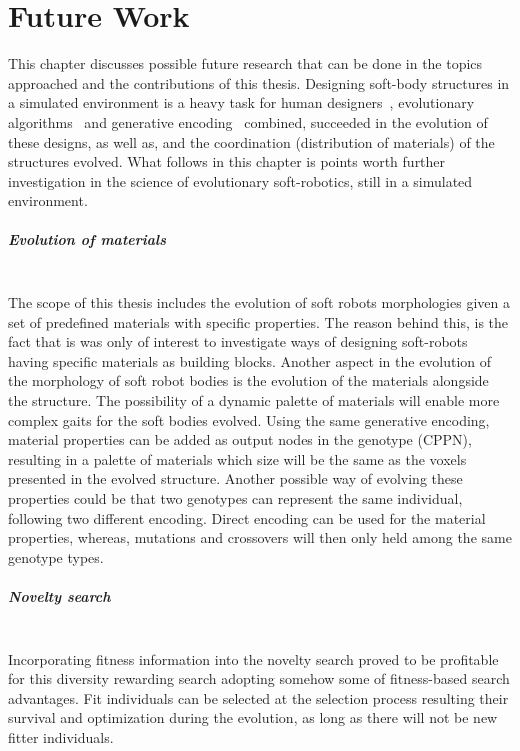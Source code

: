 
\chapter{Future Work} %

\label{Future Work} %


This chapter discusses possible future research that can be done in the topics approached and the contributions of this thesis. Designing soft-body structures in a simulated environment is a heavy task for human designers~\citep{cheney2013unshackling}, evolutionary algorithms~\citep{stanley2002evolving} and generative encoding~\citep{stanley2007compositional} combined, succeeded in the evolution of these designs, as well as, and the coordination (distribution of materials) of the structures evolved. What follows in this chapter is points worth further investigation in the science of evolutionary soft-robotics, still in a simulated environment.

\paragraph*{Evolution of materials}~\\
The scope of this thesis includes the evolution of soft robots morphologies given a set of predefined materials with specific properties. The reason behind this, is the fact that is was only of interest to investigate ways of designing soft-robots having specific materials as building blocks. Another aspect in the evolution of the morphology of soft robot bodies is the evolution of the materials alongside the structure. The possibility of a dynamic palette of materials will enable more complex gaits for the soft bodies evolved. Using the same generative encoding, material properties can be added as output nodes in the genotype (CPPN), resulting in a palette of materials which size will be the same as the voxels presented in the evolved structure. Another possible way of evolving these properties could be that two genotypes can represent the same individual, following two different encoding. Direct encoding can be used for the material properties, whereas, mutations and crossovers will then only held among the same genotype types.

\paragraph*{Novelty search}~\\
Incorporating fitness information into the novelty search proved to be profitable for this diversity rewarding search adopting somehow some of fitness-based search advantages. Fit individuals can be selected at the selection process resulting their survival and optimization during the evolution, as long as there will not be new fitter individuals.

